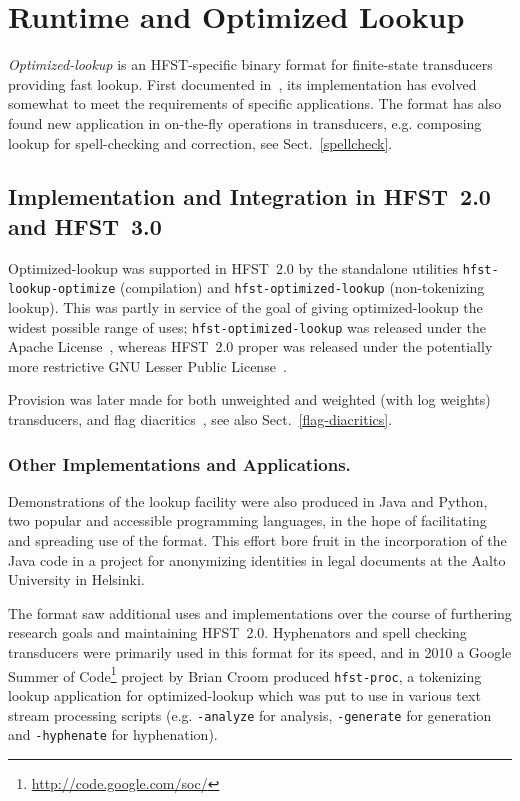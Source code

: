 \documentclass{llncs}
\begin{document}
\section{Runtime and Optimized Lookup}\label{hfst:optimized-lookup}
\emph{Optimized-lookup} is an HFST-specific binary format for finite-state
transducers providing fast lookup. First documented in~\cite{silfverberg/2009},
its implementation has evolved somewhat to meet the requirements of specific
applications. The format has also found new application in on-the-fly
operations in transducers, e.g. composing lookup for spell-checking and
correction,  see Sect.~\ref{spellcheck}.

\subsection{Implementation and Integration in HFST~2.0 and HFST~3.0}
\sloppy Optimized-lookup was supported in HFST~2.0 by the standalone utilities
\verb+hfst-lookup-optimize+ (compilation) and
\verb+hfst-optimized-lookup+ (non-token\-izing lookup). This was partly
in service of the goal of giving optimized-lookup the widest possible range
of uses; \verb+hfst-optimized-lookup+ was released under the
Apache License~\cite{apache-license}, whereas HFST~2.0 proper was released
under the potentially more restrictive GNU Lesser Public
License~\cite{lgpl-license}.

Provision was later made for both unweighted and weighted (with log weights)
transducers, and flag diacritics~\cite{beesley/2003}, see also Sect.~\ref{flag-diacritics}.

\subsubsection{Other Implementations and Applications.}
Demonstrations of the lookup facility were also
produced in Java and Python, two popular and accessible programming languages,
in the hope of facilitating and spreading use of the format. This effort
bore fruit in the incorporation of the Java code in a project for anonymizing
identities in legal documents at the Aalto University in Helsinki.

The format saw additional uses and implementations over the course of 
furthering research goals and maintaining HFST~2.0. Hyphenators and spell
checking transducers were primarily used in this format for its speed, and
in 2010 a Google Summer of Code\footnote{\url{http://code.google.com/soc/}} project by Brian Croom produced
\verb+hfst-proc+, a tokenizing lookup application for optimized-lookup which
was put to use in various text stream processing scripts (e.g.
\verb+-analyze+ for analysis, \verb+-generate+ for generation and
\verb+-hyphenate+ for hyphenation).
\end{document}
